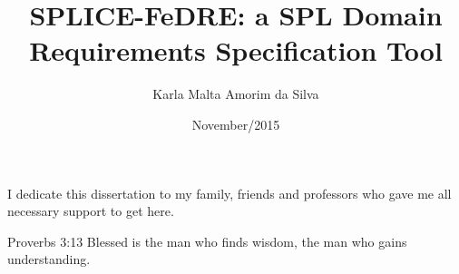 \documentclass[en,twoside,onehalfspacing,bsc]{risethesis}
\title{SPLICE-FeDRE: a SPL Domain Requirements Specification Tool}
\date{November/2015}
\author{Karla Malta Amorim da Silva}
\begin{document}
\frontmatter
\frontpage
\presentationpage

\begin{dedicatory}
I dedicate this dissertation to my family, friends and
professors who gave me all necessary support to get here.
\end{dedicatory}








\begin{epigraph}[]{Proverbs 3:13}
Blessed is the man who finds wisdom, the man who gains understanding. 
\end{epigraph}
\end{document}
